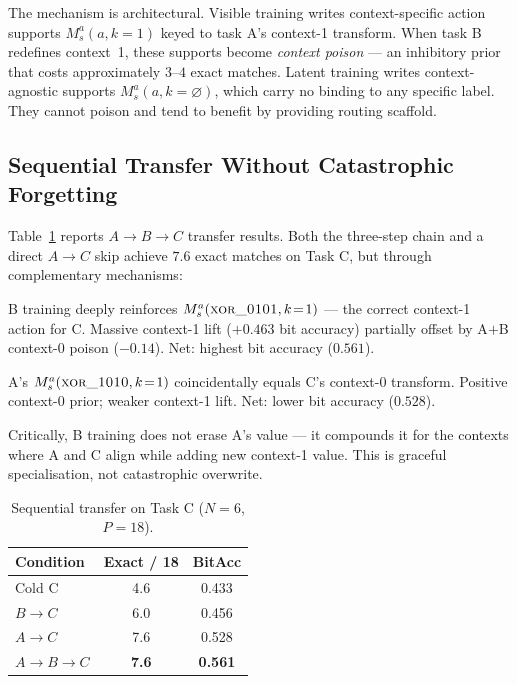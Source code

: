 \documentclass[10pt,twocolumn]{article}
\newcommand{\Ms}{M_s}
\begin{document}
The mechanism is architectural.
Visible training writes context-specific action supports
$\Ms^a(a, k\!=\!1)$ keyed to task A's context-1 transform.
When task B redefines context~1, these supports become \emph{context poison}
--- an inhibitory prior that costs approximately $3$--$4$ exact matches.
Latent training writes context-agnostic supports
$\Ms^a(a, k\!=\!\varnothing)$, which carry no binding to any specific label.
They cannot poison and tend to benefit by providing routing scaffold.

\subsection{Sequential Transfer Without Catastrophic Forgetting}
\label{sec:sequential}

Table~\ref{tab:sequential} reports $A \to B \to C$ transfer results.
Both the three-step chain and a direct $A \to C$ skip achieve $7.6$ exact
matches on Task C, but through complementary mechanisms:

\begin{description}[leftmargin=1.2em, topsep=2pt]
  \item[$A\to B\to C$] B training deeply reinforces $\Ms^a(\textsc{xor\_0101},
    k\!=\!1)$ --- the correct context-1 action for C. Massive context-1 lift
    ($+0.463$ bit accuracy) partially offset by A$+$B context-0 poison
    ($-0.14$). Net: highest bit accuracy ($0.561$).
  \item[$A\to C$ direct] A's $\Ms^a(\textsc{xor\_1010}, k\!=\!1)$ coincidentally
    equals C's context-0 transform. Positive context-0 prior; weaker context-1
    lift. Net: lower bit accuracy ($0.528$).
\end{description}

Critically, B training does not erase A's value --- it compounds it for the
contexts where A and C align while adding new context-1 value.
This is graceful specialisation, not catastrophic overwrite.

\begin{table}[t]
\centering
\caption{Sequential transfer on Task C ($N=6$, $P=18$).}
\label{tab:sequential}
\small
\begin{tabular}{lcc}
\toprule
Condition & Exact / 18 & BitAcc \\
\midrule
Cold C       & 4.6 & 0.433 \\
$B\to C$     & 6.0 & 0.456 \\
$A\to C$     & 7.6 & 0.528 \\
$A\to B\to C$ & \textbf{7.6} & \textbf{0.561} \\
\bottomrule
\end{tabular}
\end{table}
\end{document}
